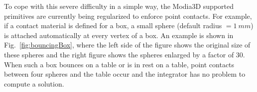 To cope with this severe difficulty in a simple way, the Modia3D supported primitives are currently being
regularized to enforce point contacts. For example, if a contact material is defined for a box, a small sphere
(default radius $= 1~mm$) is attached automatically at every vertex of a box. An example is shown in 
Fig.~\ref{fig:bouncingBox}, where the left side of the figure shows the original size of these spheres and the
right figure shows the spheres enlarged by a factor of 30. When such a box bounces on a table or is in rest
on a table, point contacts between four spheres and the table occur and the integrator has no problem
to compute a solution.
